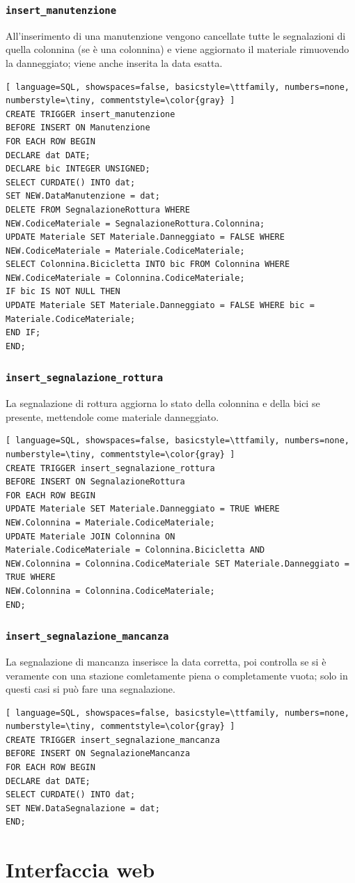\documentclass[a4paper,twoside]{article}
\begin{document}
\subsubsection{\texttt{insert\_manutenzione}}
All'inserimento di una manutenzione vengono cancellate tutte le segnalazioni di quella colonnina (se è una colonnina) e viene aggiornato il materiale rimuovendo la danneggiato; viene anche inserita la data esatta.
\begin{lstlisting}[ language=SQL, showspaces=false, basicstyle=\ttfamily, numbers=none, numberstyle=\tiny, commentstyle=\color{gray} ]
CREATE TRIGGER insert_manutenzione
BEFORE INSERT ON Manutenzione
FOR EACH ROW BEGIN
DECLARE dat DATE;
DECLARE bic INTEGER UNSIGNED;
SELECT CURDATE() INTO dat;
SET NEW.DataManutenzione = dat;
DELETE FROM SegnalazioneRottura WHERE
NEW.CodiceMateriale = SegnalazioneRottura.Colonnina;
UPDATE Materiale SET Materiale.Danneggiato = FALSE WHERE
NEW.CodiceMateriale = Materiale.CodiceMateriale;
SELECT Colonnina.Bicicletta INTO bic FROM Colonnina WHERE
NEW.CodiceMateriale = Colonnina.CodiceMateriale;
IF bic IS NOT NULL THEN
UPDATE Materiale SET Materiale.Danneggiato = FALSE WHERE bic = Materiale.CodiceMateriale;
END IF;
END;
\end{lstlisting}
\subsubsection{\texttt{insert\_segnalazione\_rottura}}
La segnalazione di rottura aggiorna lo stato della colonnina e della bici se presente, mettendole come materiale danneggiato.
\begin{lstlisting}[ language=SQL, showspaces=false, basicstyle=\ttfamily, numbers=none, numberstyle=\tiny, commentstyle=\color{gray} ]
CREATE TRIGGER insert_segnalazione_rottura
BEFORE INSERT ON SegnalazioneRottura
FOR EACH ROW BEGIN
UPDATE Materiale SET Materiale.Danneggiato = TRUE WHERE
NEW.Colonnina = Materiale.CodiceMateriale;
UPDATE Materiale JOIN Colonnina ON
Materiale.CodiceMateriale = Colonnina.Bicicletta AND
NEW.Colonnina = Colonnina.CodiceMateriale SET Materiale.Danneggiato = TRUE WHERE
NEW.Colonnina = Colonnina.CodiceMateriale;
END;
\end{lstlisting}
\subsubsection{\texttt{insert\_segnalazione\_mancanza}}
La segnalazione di mancanza inserisce la data corretta, poi controlla se si è veramente con una stazione comletamente piena o completamente vuota; solo in questi casi si può fare una segnalazione.
\begin{lstlisting}[ language=SQL, showspaces=false, basicstyle=\ttfamily, numbers=none, numberstyle=\tiny, commentstyle=\color{gray} ]
CREATE TRIGGER insert_segnalazione_mancanza
BEFORE INSERT ON SegnalazioneMancanza
FOR EACH ROW BEGIN
DECLARE dat DATE;
SELECT CURDATE() INTO dat;
SET NEW.DataSegnalazione = dat;
END;
\end{lstlisting}

\section{Interfaccia web}
\end{document}
